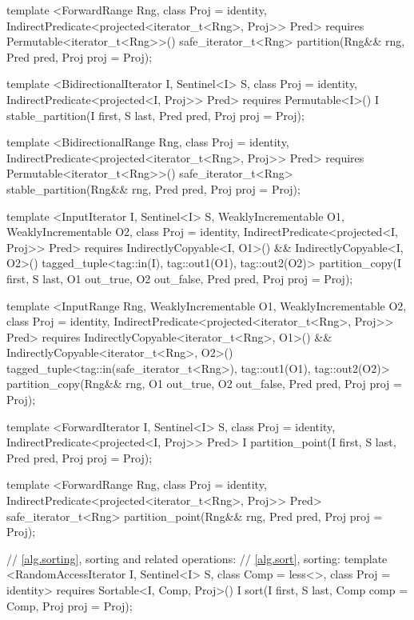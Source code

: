 \begin{codeblock}
{{{{  template <ForwardRange Rng, class Proj = identity,
      IndirectPredicate<projected<iterator_t<Rng>, Proj>> Pred>
    requires Permutable<iterator_t<Rng>>()
    safe_iterator_t<Rng>
      partition(Rng&& rng, Pred pred, Proj proj = Proj{});

  template <BidirectionalIterator I, Sentinel<I> S, class Proj = identity,
      IndirectPredicate<projected<I, Proj>> Pred>
    requires Permutable<I>()
    I stable_partition(I first, S last, Pred pred, Proj proj = Proj{});

  template <BidirectionalRange Rng, class Proj = identity,
      IndirectPredicate<projected<iterator_t<Rng>, Proj>> Pred>
    requires Permutable<iterator_t<Rng>>()
    safe_iterator_t<Rng>
      stable_partition(Rng&& rng, Pred pred, Proj proj = Proj{});

  template <InputIterator I, Sentinel<I> S, WeaklyIncrementable O1, WeaklyIncrementable O2,
      class Proj = identity, IndirectPredicate<projected<I, Proj>> Pred>
    requires IndirectlyCopyable<I, O1>() && IndirectlyCopyable<I, O2>()
    tagged_tuple<tag::in(I), tag::out1(O1), tag::out2(O2)>
      partition_copy(I first, S last, O1 out_true, O2 out_false, Pred pred,
                     Proj proj = Proj{});

  template <InputRange Rng, WeaklyIncrementable O1, WeaklyIncrementable O2,
      class Proj = identity,
      IndirectPredicate<projected<iterator_t<Rng>, Proj>> Pred>
    requires IndirectlyCopyable<iterator_t<Rng>, O1>() &&
      IndirectlyCopyable<iterator_t<Rng>, O2>()
    tagged_tuple<tag::in(safe_iterator_t<Rng>), tag::out1(O1), tag::out2(O2)>
      partition_copy(Rng&& rng, O1 out_true, O2 out_false, Pred pred, Proj proj = Proj{});

  template <ForwardIterator I, Sentinel<I> S, class Proj = identity,
      IndirectPredicate<projected<I, Proj>> Pred>
    I partition_point(I first, S last, Pred pred, Proj proj = Proj{});

  template <ForwardRange Rng, class Proj = identity,
      IndirectPredicate<projected<iterator_t<Rng>, Proj>> Pred>
    safe_iterator_t<Rng>
      partition_point(Rng&& rng, Pred pred, Proj proj = Proj{});

  // \ref{alg.sorting}, sorting and related operations:
  // \ref{alg.sort}, sorting:
  template <RandomAccessIterator I, Sentinel<I> S, class Comp = less<>,
      class Proj = identity>
    requires Sortable<I, Comp, Proj>()
    I sort(I first, S last, Comp comp = Comp{}, Proj proj = Proj{});

}}}}
\end{codeblock}
